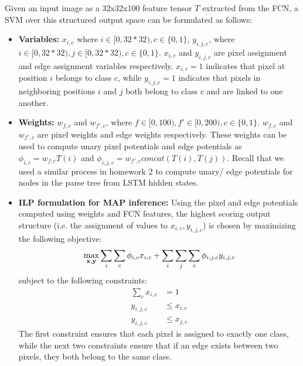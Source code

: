 \documentclass[11pt,addpoints,answers]{exam}
\numberwithin{equation}{section} %
\numberwithin{figure}{section} %
\numberwithin{table}{section} %
\begin{document}
Given an input image as a 32x32x100 feature tensor $T$ extracted from the FCN, a SVM over this structured output space can be formulated as follows:
\noindent
\begin{itemize}
    \item \textbf{Variables:} $x_{i,c}$ where $i \in [0,32*32), c \in \{0,1\}$, $y_{i,j,c}$, where $i \in [0,32*32), j \in [0,32*32), c \in \{0,1\}$. $x_{i,c}$ and $y_{i,j,c}$ are pixel assignment and edge assignment variables respectively. $x_{i,c} = 1$ indicates that pixel at position $i$ belongs to class $c$, while $y_{i,j,c} = 1$ indicates that pixels in neighboring positions $i$ and $j$ both belong to class $c$ and are linked to one another.
    \item \textbf{Weights:} $w_{f,c}$ and $w_{f',c}$, where $f \in [0,100), f' \in [0,200), c \in \{0,1\}$. $w_{f,c}$ and $w_{f',c}$ are pixel weights and edge weights respectively. These weights can be used to compute unary pixel potentials and edge potentials as $\phi_{i,c} = w_{f,c} T(i)$ and $\phi_{i,j,c} = w_{f',c} concat(T(i), T(j))$. Recall that we used a similar process in homework 2 to compute unary/ edge potentials for nodes in the parse tree from LSTM hidden states.
    \item \textbf{ILP formulation for MAP inference:} Using the pixel and edge potentials computed using weights and FCN features, the highest scoring output structure (i.e. the assignment of values to $x_{i,c}, y_{i,j,c}$) is chosen by maximizing the following objective:\\
    \begin{align*}
     \max_{\mathbf{x}, \mathbf{y}} \sum_i \sum_c \phi_{i,c} x_{i,c} + \sum_i \sum_j \sum_c \phi_{i,j,c} y_{i,j,c} 
    \end{align*}
    subject to the following constraints:\\
    \begin{align*}
        \sum_c x_{i,c} &= 1\\
        y_{i,j,c} &\leq x_{i,c}\\
        y_{i,j,c} &\leq x_{j,c}
    \end{align*}
    The first constraint ensures that each pixel is assigned to exactly one class, while the next two constraints ensure that if an edge exists between two pixels, they both belong to the same class.


\end{itemize}
\end{document}
